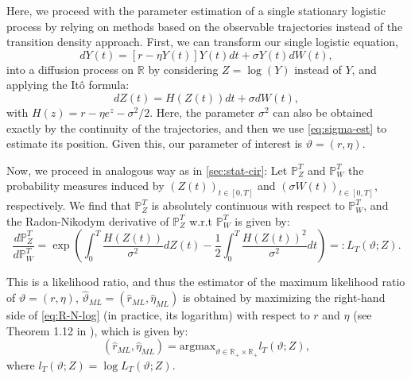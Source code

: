 \documentclass[12pt]{article}
\begin{document}
Here, we proceed with the parameter estimation of a single stationary logistic process by relying on methods based on the observable trajectories instead of the transition density approach. First, we can transform our single logistic equation,
\begin{equation}\label{eq:single-logistic}
dY(t)=[r-\eta Y(t)]Y(t)dt+\sigma Y(t)dW(t),
\end{equation}
into a diffusion process on $\mathbb{R}$ by considering $Z=\log(Y)$ instead of $Y$, and applying the Itô formula:
\begin{equation}\label{eq:log-logistic}
dZ(t)=H(Z(t))dt+\sigma dW(t),
\end{equation}
with $H(z)=r-\eta e^z-\sigma^2/2$. Here, the parameter $\sigma^2$ can also be obtained exactly by the continuity of the trajectories, and then we use \eqref{eq:sigma-est} to estimate its position. Given this, our parameter of interest is  $\vartheta=(r,\eta)$.

Now, we proceed in analogous way as in \ref{sec:stat-cir}:  Let  $\mathbb{P}^T_{Z}$ and $\mathbb{P}^T_{W}$ the probability measures induced by  $(Z(t))_{t\in[0,T]}$ and  $(\sigma W(t))_{t\in[0,T]}$, respectively. We find that $\mathbb{P}^T_{Z}$ is absolutely continuous with respect to $\mathbb{P}^T_{W}$, and   the Radon-Nikodym derivative of $\mathbb{P}^T_{Z}$ w.r.t $\mathbb{P}^T_{W}$ is given by:
\begin{equation}\label{eq:R-N-log}
\frac{d\mathbb{P}^T_{Z}}{d\mathbb{P}^T_{W}}
=\exp\left(\int_0^T\frac{H(Z(t))}{\sigma^2}dZ(t)-\frac{1}{2}\int_0^T\frac{H(Z(t))^2}{\sigma^2}dt\right)=:L_T(\vartheta; Z).
\end{equation}

This is a likelihood ratio, and thus the estimator of the maximum likelihood ratio of $\vartheta=(r,\eta)$, $\hat{\vartheta}_{ML}=(\hat{r}_{ML},\hat{\eta}_{ML})$ is obtained by maximizing the right-hand side of \eqref{eq:R-N-log} (in practice, its logarithm) with respect to $r$ and $\eta$ (see Theorem 1.12 in \citep{kutoyants2004statistical}), which is given by:
\begin{equation}\label{eq:ML-ST}
(\hat{r}_{ML}, \hat{\eta}_{ML})=\text{argmax}_{\vartheta\in \mathbb{R}_+\times\mathbb{R}_+} l_T(\vartheta; Z),
\end{equation}
where $l_T(\vartheta; Z)=\log L_T(\vartheta; Z)$.
\end{document}
